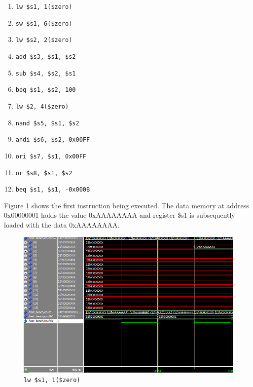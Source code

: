 \documentclass[12pt]{article}
\begin{document}
\begin{enumerate}
	\item \texttt{lw \$s1, 1(\$zero)}
	\item \texttt{sw \$s1, 6(\$zero)}
	\item \texttt{lw \$s2, 2(\$zero)}
	\item \texttt{add \$s3, \$s1, \$s2}
	\item \texttt{sub \$s4, \$s2, \$s1}
	\item \texttt{beq \$s1, \$s2, 100}
	\item \texttt{lw \$2, 4(\$zero)}
	\item \texttt{nand \$s5, \$s1, \$s2}
	\item \texttt{andi \$s6, \$s2, 0x00FF}
	\item \texttt{ori \$s7, \$s1, 0x00FF}
	\item \texttt{or \$s8, \$s1, \$s2}
	\item \texttt{beq \$s1, \$s1, -0x000B}
\end{enumerate}

Figure \ref{fig:1-instr} shows the first instruction being executed. The data memory at address 0x00000001 holds the value 0xAAAAAAAA and register \$s1 is subsequently loaded with the data 0xAAAAAAAA.
\begin{figure}[H]
\centering
\includegraphics[width=\linewidth]{simulation/1-instr}
\caption{\texttt{lw \$s1, 1(\$zero)}}
\label{fig:1-instr}
\end{figure}
\end{document}
